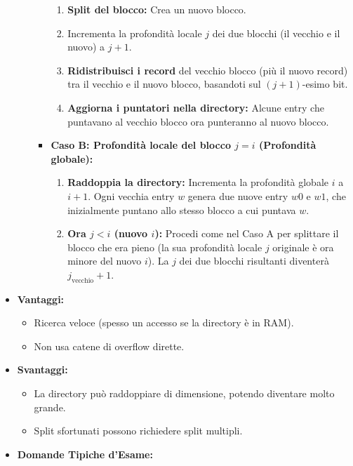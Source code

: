 \begin{itemize}
\begin{enumerate}
\begin{itemize}
            \begin{enumerate}
                \item \textbf{Split del blocco:} Crea un nuovo blocco.
                \item Incrementa la profondità locale $j$ dei due blocchi (il vecchio e il nuovo) a $j+1$.
                \item \textbf{Ridistribuisci i record} del vecchio blocco (più il nuovo record) tra il vecchio e il nuovo blocco, basandoti sul $(j+1)$-esimo bit.
                \item \textbf{Aggiorna i puntatori nella directory:} Alcune entry che puntavano al vecchio blocco ora punteranno al nuovo blocco.
            \end{enumerate}
            \item \textbf{Caso B: Profondità locale del blocco $j = i$ (Profondità globale):}
            \begin{enumerate}
                \item \textbf{Raddoppia la directory:} Incrementa la profondità globale $i$ a $i+1$. Ogni vecchia entry $w$ genera due nuove entry $w0$ e $w1$, che inizialmente puntano allo stesso blocco a cui puntava $w$.
                \item \textbf{Ora $j < i$ (nuovo $i$):} Procedi come nel Caso A per splittare il blocco che era pieno (la sua profondità locale $j$ originale è ora minore del nuovo $i$). La $j$ dei due blocchi risultanti diventerà $j_{\text{vecchio}}+1$.
            \end{enumerate}
        \end{itemize}
    \end{enumerate}
    \item \textbf{Vantaggi:}
    \begin{itemize}
        \item Ricerca veloce (spesso un accesso se la directory è in RAM).
        \item Non usa catene di overflow dirette.
    \end{itemize}
    \item \textbf{Svantaggi:}
    \begin{itemize}
        \item La directory può raddoppiare di dimensione, potendo diventare molto grande.
        \item Split sfortunati possono richiedere split multipli.
    \end{itemize}
    \item \textbf{Domande Tipiche d'Esame:}

\end{itemize}
